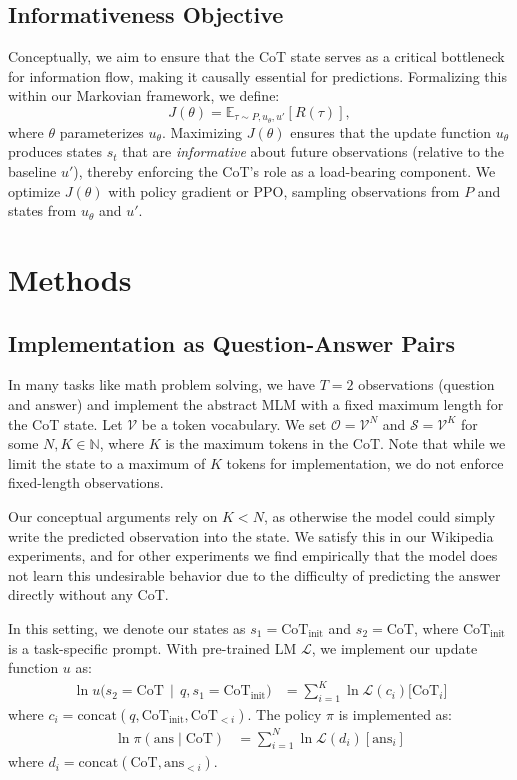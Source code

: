 \documentclass[letterpaper]{article} %
\begin{document}
\subsection{Informativeness Objective}

Conceptually, we aim to ensure that the CoT state serves as a critical bottleneck for information flow, making it causally essential for predictions. Formalizing this within our Markovian framework, we define:
\[
  J(\theta)=\mathbb{E}_{\tau \sim P,u_\theta,u'}\left[R(\tau)\right],
\]
where $\theta$ parameterizes $u_\theta$. Maximizing $J(\theta)$ ensures that the update function $u_\theta$ produces states $s_t$ that are \emph{informative} about future observations (relative to the baseline $u'$), thereby enforcing the CoT's role as a load-bearing component. We optimize $J(\theta)$ with policy gradient or PPO, sampling observations from $P$ and states from $u_\theta$ and $u'$.

\section{Methods}
\label{sec:method}
\subsection{Implementation as Question-Answer Pairs}
In many tasks like math problem solving, we have $T=2$ observations (question and answer) and implement the abstract MLM with a fixed maximum length for the CoT state. Let $\mathcal{V}$ be a token vocabulary. We set $\mathcal{O} = \mathcal{V}^N$ and $\mathcal{S} = \mathcal{V}^K$ for some $N, K \in \mathbb{N}$, where $K$ is the maximum tokens in the CoT. Note that while we limit the state to a maximum of $K$ tokens for implementation, we do not enforce fixed-length observations. 

Our conceptual arguments rely on $K < N$, as otherwise the model could simply write the predicted observation into the state. We satisfy this in our Wikipedia experiments, and for other experiments we find empirically that the model does not learn this undesirable behavior due to the difficulty of predicting the answer directly without any CoT.

In this setting, we denote our states as $s_1 = \text{CoT}_{\text{init}}$ and $s_2 = \text{CoT}$, where $\text{CoT}_{\text{init}}$ is a task-specific prompt. With pre-trained LM $\mathcal{L}$, we implement our update function $u$ as:
\begin{align}
\ln u\bigl(s_2 = \text{CoT} \,\mid\, q, s_1 = \text{CoT}_{\text{init}}\bigr) &= 
\sum_{i=1}^{K} \ln \mathcal{L}(c_i)\bigl[\text{CoT}_i\bigr]
\end{align}
where $c_i = \text{concat}(q, \text{CoT}_{\text{init}}, \text{CoT}_{<i})$. The policy $\pi$ is implemented as:
\begin{align}
\ln \pi(\text{ans} \mid \text{CoT}) &=  \sum_{i=1}^{N} \ln \mathcal{L}(d_i) [\text{ans}_i]
\end{align}
where $d_i = \text{concat}(\text{CoT}, \text{ans}_{<i})$.
\end{document}
